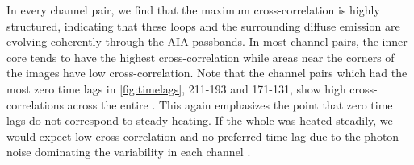 In every channel pair, we find that the maximum cross-correlation is highly structured, indicating that these loops and the surrounding diffuse emission are evolving coherently through the AIA passbands. In most channel pairs, the inner core tends to have the highest cross-correlation while areas near the corners of the images have low cross-correlation. Note that the channel pairs which had the most zero time lags in \autoref{fig:timelags}, 211-193 and 171-131, show high cross-correlations across the entire \AR{}. This again emphasizes the point that zero time lags do not correspond to steady heating. If the whole \AR{} was heated steadily, we would expect low cross-correlation and no preferred time lag due to the photon noise dominating the variability in each channel \citep{viall_signatures_2016}.
